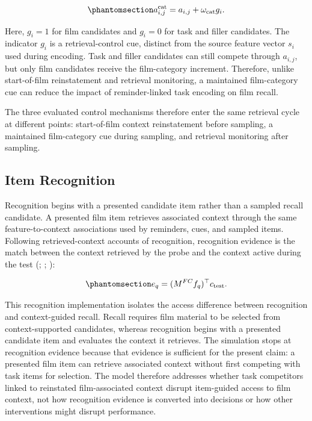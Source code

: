 \documentclass[
  man,
  floatsintext,
  longtable,
  nolmodern,
  notxfonts,
  notimes,
  draftfirst,
  colorlinks=true,linkcolor=blue,citecolor=blue,urlcolor=blue]{apa7}
\begin{document}
\begin{equation}\phantomsection\label{eq-film-category-support}{
a^{\mathrm{cat}}_{i,j} = a_{i,j} + \omega_{\mathrm{cat}} g_i .
}\end{equation}

Here, \(g_i = 1\) for film candidates and \(g_i = 0\) for task and
filler candidates. The indicator \(g_i\) is a retrieval-control cue,
distinct from the source feature vector \(s_i\) used during encoding.
Task and filler candidates can still compete through \(a_{i,j}\), but
only film candidates receive the film-category increment. Therefore,
unlike start-of-film reinstatement and retrieval monitoring, a
maintained film-category cue can reduce the impact of reminder-linked
task encoding on film recall.

The three evaluated control mechanisms therefore enter the same
retrieval cycle at different points: start-of-film context reinstatement
before sampling, a maintained film-category cue during sampling, and
retrieval monitoring after sampling.

\subsection{Item Recognition}\label{item-recognition}

Recognition begins with a presented candidate item rather than a sampled
recall candidate. A presented film item retrieves associated context
through the same feature-to-context associations used by reminders,
cues, and sampled items. Following retrieved-context accounts of
recognition, recognition evidence is the match between the context
retrieved by the probe and the context active during the test
(;
;
):

\begin{equation}\phantomsection\label{eq-recognition-evidence}{
e_q = (M^{FC} f_q)^\top c_{\mathrm{test}} .
}\end{equation}

This recognition implementation isolates the access difference between
recognition and context-guided recall. Recall requires film material to
be selected from context-supported candidates, whereas recognition
begins with a presented candidate item and evaluates the context it
retrieves. The simulation stops at recognition evidence because that
evidence is sufficient for the present claim: a presented film item can
retrieve associated context without first competing with task items for
selection. The model therefore addresses whether task competitors linked
to reinstated film-associated context disrupt item-guided access to film
context, not how recognition evidence is converted into decisions or how
other interventions might disrupt performance.
\end{document}
